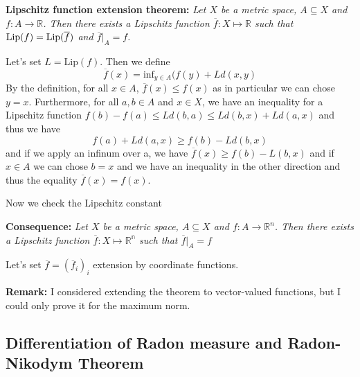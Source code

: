 \vspace{2ex}
\textbf{Lipschitz function extension theorem:} \textit{Let $X$ be a metric space,
$A\subseteq X$ and $f:A\rightarrow\mathbb{R}$. Then there exists a Lipschitz
function $\overline f:X\mapsto\mathbb{R}$ such that $\textnormal{Lip}(f)=\textnormal{Lip}
(\overline f)$ and $\overline f|_A=f$.}

\vspace{1ex}
Let's set
$L=\text{Lip}(f)$. Then we define
\[\overline f(x) = \text{inf}_{y\in A}(f(y)+Ld(x,y)\]
By the definition, for all $x\in A$, $\overline f(x)\leq f(x)$ as in particular
we can chose $y=x$.
Furthermore, for all $a,b\in A$ and $x\in X$, we have an inequality for a
Lipschitz function $f(b)-f(a)\leq Ld(b,a)\leq Ld(b,x)+Ld(a,x)$ and thus we have
\[ f(a)+Ld(a,x)\geq f(b)-Ld(b,x)\] 
and if we apply an infinum over a, we have $\overline f(x)\geq f(b)-L(b,x)$ and
if $x\in A$ we can chose $b=x$ and we have an inequality in the other direction
and thus the equality $\overline f(x)=f(x)$.

\vspace{1ex}
Now we check the Lipschitz constant
%

\vspace{1ex}
\textbf{Consequence:} \textit{Let $X$ be a metric space, $A\subseteq X$ and
$f:A\rightarrow\mathbb{R}^n$. Then there exists a Lipschitz
function $\overline f:X\mapsto\mathbb{R^n}$ such that $\overline f|_A=f$}

\vspace{1ex}
Let's set $\overline f = (\overline f_i)_i$ extension by coordinate functions. 

\vspace{1ex}
\textbf{Remark:} I considered extending the theorem to vector-valued
functions, but I could only prove it for the maximum norm.

\subsection{Differentiation of Radon measure and Radon-Nikodym Theorem}

